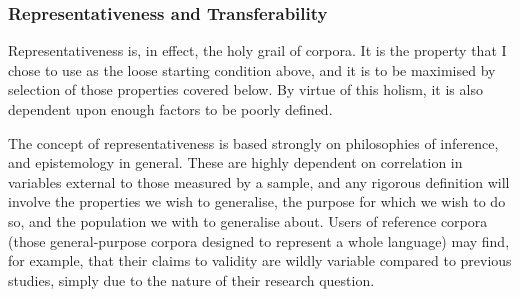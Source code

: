 







\subsubsection{Representativeness and Transferability}
Representativeness is, in effect, the holy grail of corpora.  It is the property that I chose to use as the loose starting condition above, and it is to be maximised by selection of those properties covered below.  By virtue of this holism, it is also dependent upon enough factors to be poorly defined.

The concept of representativeness is based strongly on philosophies of inference, and epistemology in general.  These are highly dependent on correlation in variables external to those measured by a sample, and any rigorous definition will involve the properties we wish to generalise, the purpose for which we wish to do so, and the population we with to generalise about.  Users of reference corpora (those general-purpose corpora designed to represent a whole language) may find, for example, that their claims to validity are wildly variable compared to previous studies, simply due to the nature of their research question.



